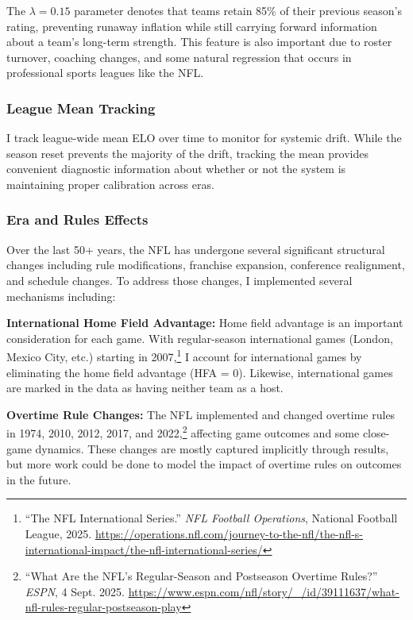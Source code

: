 \documentclass[a4paper,10.5pt,twoside]{article}
\begin{document}
The $\lambda = 0.15$ parameter denotes that teams retain 85\% of their previous season's rating, preventing runaway inflation while still carrying forward information about a team's long-term strength. This feature is also important due to roster turnover, coaching changes, and some natural regression that occurs in professional sports leagues like the NFL.

\subsubsection{League Mean Tracking}

I track league-wide mean ELO over time to monitor for systemic drift. While the season reset prevents the majority of the drift, tracking the mean provides convenient diagnostic information about whether or not the system is maintaining proper calibration across eras. 

\subsubsection{Era and Rules Effects}

Over the last 50+ years, the NFL has undergone several significant structural changes including rule modifications, franchise expansion, conference realignment, and schedule changes. To address those changes, I implemented several mechanisms including: 

\textbf{International Home Field Advantage:} Home field advantage is an important consideration for each game. With regular-season international games (London, Mexico City, etc.) starting in 2007,\footnote{“The NFL International Series.” \textit{NFL Football Operations}, National Football League, 2025. \url{https://operations.nfl.com/journey-to-the-nfl/the-nfl-s-international-impact/the-nfl-international-series/}} I account for international games by eliminating the home field advantage (HFA = 0). Likewise, international games are marked in the data as having neither team as a host. 

\textbf{Overtime Rule Changes:} The NFL implemented and changed overtime rules in 1974, 2010, 2012, 2017, and 2022,\footnote{“What Are the NFL’s Regular-Season and Postseason Overtime Rules?” \textit{ESPN}, 4 Sept. 2025. \url{https://www.espn.com/nfl/story/_/id/39111637/what-nfl-rules-regular-postseason-play}} affecting game outcomes and some close-game dynamics. These changes are mostly captured implicitly through results, but more work could be done to model the impact of overtime rules on outcomes in the future. 
\end{document}
